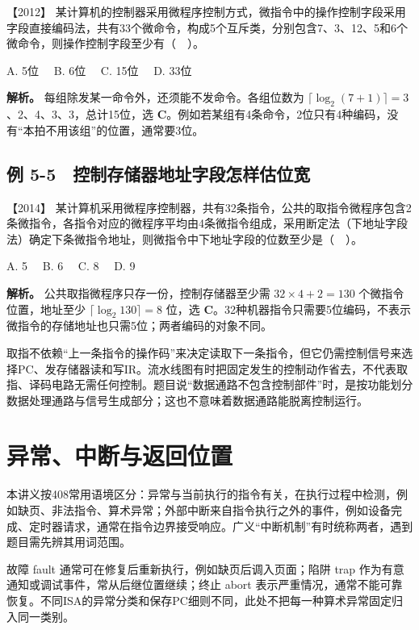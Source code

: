 \noindent{}【2012】 某计算机的控制器采用微程序控制方式，微指令中的操作控制字段采用字段直接编码法，共有33个微命令，构成5个互斥类，分别包含7、3、12、5和6个微命令，则操作控制字段至少有（　）。

A. 5位　 B. 6位　 C. 15位　 D. 33位


\textbf{解析。} 每组除发某一命令外，还须能不发命令。各组位数为 \(\lceil\log_2(7+1)\rceil=3\)、2、4、3、3，总计15位，选 \textbf{C}。例如若某组有4条命令，2位只有4种编码，没有``本拍不用该组''的位置，通常要3位。

\subsection{例 5-5　控制存储器地址字段怎样估位宽}\label{co-ex5-5}

\noindent{}【2014】 某计算机采用微程序控制器，共有32条指令，公共的取指令微程序包含2条微指令，各指令对应的微程序平均由4条微指令组成，采用断定法（下地址字段法）确定下条微指令地址，则微指令中下地址字段的位数至少是（　）。

A. 5　 B. 6　 C. 8　 D. 9


\textbf{解析。} 公共取指微程序只存一份，控制存储器至少需 \(32\times4+2=130\) 个微指令位置，地址至少 \(\lceil\log_2 130\rceil=8\) 位，选 \textbf{C}。32种机器指令只需要5位编码，不表示微指令的存储地址也只需5位；两者编码的对象不同。

取指不依赖``上一条指令的操作码''来决定读取下一条指令，但它仍需控制信号来选择PC、发存储器读和写IR。流水线图有时把固定发生的控制动作省去，不代表取指、译码电路无需任何控制。题目说``数据通路不包含控制部件''时，是按功能划分数据处理通路与信号生成部分；这也不意味着数据通路能脱离控制运行。

\section{异常、中断与返回位置}\label{co-05-05}

本讲义按408常用语境区分：异常与当前执行的指令有关，在执行过程中检测，例如缺页、非法指令、算术异常；外部中断来自指令执行之外的事件，例如设备完成、定时器请求，通常在指令边界接受响应。广义``中断机制''有时统称两者，遇到题目需先辨其用词范围。

故障 fault 通常可在修复后重新执行，例如缺页后调入页面；陷阱 trap 作为有意通知或调试事件，常从后继位置继续；终止 abort 表示严重情况，通常不能可靠恢复。不同ISA的异常分类和保存PC细则不同，此处不把每一种算术异常固定归入同一类别。


